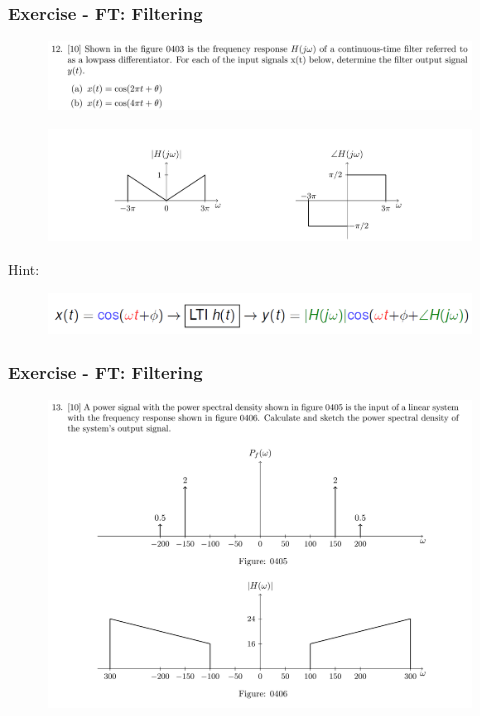 \documentclass{beamer}
\begin{document}
\begin{frame}[t]
    \frametitle{Exercise - FT: Filtering}
    \begin{figure}
        \includegraphics[width=1\linewidth]{q12a}
    \end{figure}
    \begin{figure}
        \includegraphics[width=1\linewidth]{q12b}
    \end{figure}
    Hint:
    \begin{figure}
        \includegraphics[width=0.8\linewidth]{cosin_cosout}
    \end{figure}
 
\end{frame}

\begin{frame}[t]
    \frametitle{Exercise - FT: Filtering}
    \begin{figure}
        \includegraphics[width=0.8\linewidth]{q13}
    \end{figure}

\end{frame}
\end{document}
